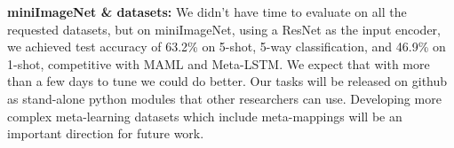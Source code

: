 \documentclass{article}
\begin{document}
\vspace{-0.1em}
\textbf{miniImageNet \& datasets:} We didn't have time to evaluate on all the requested datasets, but on miniImageNet, using a ResNet as the input encoder, we achieved test accuracy of 63.2\% on 5-shot, 5-way classification, and 46.9\% on 1-shot, competitive with MAML and Meta-LSTM. We expect that with more than a few days to tune we could do better. Our tasks will be released on github as stand-alone python modules that other researchers can use. Developing more complex meta-learning datasets which include meta-mappings will be an important direction for future work.\par
\end{document}
